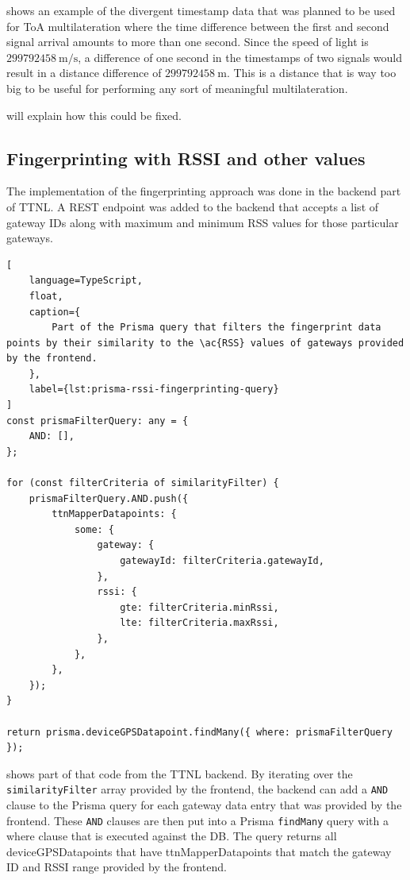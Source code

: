  shows an example of the divergent timestamp data that was planned to be used for \ac{ToA} multilateration where the time difference between the first and second signal arrival amounts to more than one second.
Since the speed of light is $299792458\ \mathrm{m/s}$, a difference of one second in the timestamps of two signals would result in a distance difference of $299792458\ \mathrm{m}$.
This is a distance that is way too big to be useful for performing any sort of meaningful multilateration.

 will explain how this could be fixed.

\subsection{Fingerprinting with \acs{RSSI} and other values}\label{sec:fingerprinting-implementation}

The implementation of the fingerprinting approach was done in the backend part of \ac{TTNL}.
A \ac{REST} endpoint was added to the backend that accepts a list of gateway IDs along with maximum and minimum \ac{RSS} values for those particular gateways.

\begin{lstlisting}[
    language=TypeScript,
    float,
    caption={
        Part of the Prisma query that filters the fingerprint data points by their similarity to the \ac{RSS} values of gateways provided by the frontend.
    },
    label={lst:prisma-rssi-fingerprinting-query}
]
const prismaFilterQuery: any = {
    AND: [],
};

for (const filterCriteria of similarityFilter) {
    prismaFilterQuery.AND.push({
        ttnMapperDatapoints: {
            some: {
                gateway: {
                    gatewayId: filterCriteria.gatewayId,
                },
                rssi: {
                    gte: filterCriteria.minRssi,
                    lte: filterCriteria.maxRssi,
                },
            },
        },
    });
}

return prisma.deviceGPSDatapoint.findMany({ where: prismaFilterQuery });
\end{lstlisting}

 shows part of that code from the \ac{TTNL} backend.
By iterating over the \lstinline|similarityFilter| array provided by the frontend, the backend can add a \lstinline|AND| clause to the Prisma query for each gateway data entry that was provided by the frontend.
These \lstinline|AND| clauses are then put into a Prisma \lstinline|findMany| query with a where clause that is executed against the \ac{DB}.
The query returns all deviceGPSDatapoints that have ttnMapperDatapoints that match the gateway ID and \ac{RSSI} range provided by the frontend.

